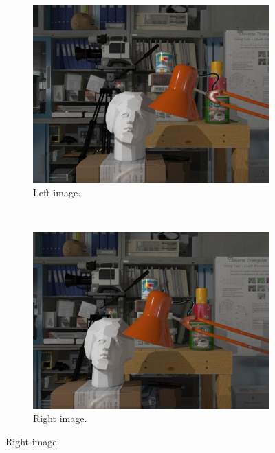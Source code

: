\begin{figure}[h!]
\centering
\begin{subfigure}[]{0.4\textwidth}
\centering
\includegraphics[width=1\textwidth]{./img/left_watermarked.jpg}
\caption{\small{Left image.}}
\label{fig:vs1}
\end{subfigure}%
~ \quad
\begin{subfigure}[]{0.4\textwidth}
\centering
\includegraphics[width= 1\textwidth]{./img/right_watermarked.jpg}
\caption{\small{Right image.}}
\label{fig:vs2}
  \end{subfigure}
 

\end{figure}
